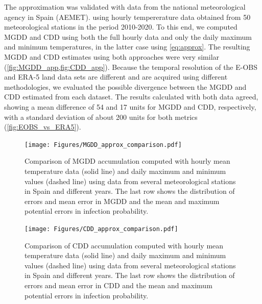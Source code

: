 The approximation was validated with data from the national meteorological
agency in Spain (AEMET). using hourly tempererature data obtained
from 50 meteorological stations in the period 2010-2020. To this end, we
computed MGDD and CDD using both the full hourly data and only the daily
maximum and minimum temperatures, in the latter
case using \cref{eq:approx}. The resulting MGDD and CDD estimates using both
approaches were very similar (\cref{fig:MGDD_app,fig:CDD_app}). Because the
temporal resolution
of the E-OBS and ERA-5 land data sets are different and are acquired using
different methodologies, we evaluated the possible divergence between the MGDD
and CDD estimated from each dataset. The results calculated with
both data agreed, showing a mean difference of 54 and 17 units for MGDD and
CDD, respectively, with a standard deviation of about 200 units for both
metrics
(\cref{fig:EOBS_vs_ERA5}).

\begin{figure}[H]
    \centering
    \texttt{[image: Figures/MGDD\_approx\_comparison.pdf]}
    \caption[Validation of MGDD computation from daily temperature
        data]{Comparison of MGDD accumulation computed with hourly mean
        temperature data (solid line) and daily maximum and minimum values
        (dashed
        line) using data from several meteorological stations in Spain and
        different
        years. The last row shows the distribution of errors and mean error in
        MGDD and
        the mean and maximum potential errors in infection probability.}
    \label{fig:MGDD_app}
\end{figure}

\begin{figure}[H]
    \centering
    \texttt{[image: Figures/CDD\_approx\_comparison.pdf]}
    \caption[Validation of CDD computation from daily temperature
        data]{Comparison of CDD accumulation computed with hourly mean
        temperature data (solid line) and daily maximum and minimum values
        (dashed
        line) using data from several meteorological stations in Spain and
        different
        years. The last row shows the distribution of errors and mean error in
        CDD and
        the mean and maximum potential errors in infection probability.}
    \label{fig:CDD_app}
\end{figure}

